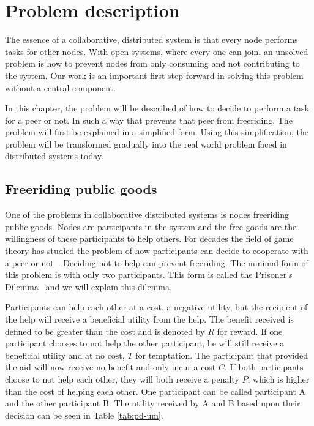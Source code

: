 \chapter{Problem description}
The essence of a collaborative, distributed system is that every node performs tasks for other nodes.
With open systems, where every one can join, an unsolved problem is how to prevent nodes
from only consuming and not contributing to the system.
Our work is an important first step forward in solving this problem without a central component.

In this chapter, the problem will be described of how to decide to perform a task for a peer or not.
In such a way that prevents that peer from freeriding.
The problem will first be explained in a simplified form.
Using this simplification, the problem will be transformed gradually
into the real world problem faced in distributed systems today.

\section{Freeriding public goods}
One of the problems in collaborative distributed systems is nodes freeriding public goods.
Nodes are participants in the system and the free goods are the willingness of these participants to help others.
For decades the field of game theory has studied the problem of how
participants can decide to cooperate with a peer or not~\cite{Hardin-Tragedy}.
Deciding not to help can prevent freeriding.
The minimal form of this problem is with only two participants.
This form is called the Prisoner's Dilemma~\cite{Nowak-PrisonerDilemma,Lai-Incentives}
and we will explain this dilemma.

Participants can help each other at a cost, a negative utility,
but the recipient of the help will receive a beneficial utility from the help.
The benefit received is defined to be greater
than the cost and is denoted by $R$ for reward.
If one participant chooses to not help the other participant,
he will still receive a beneficial utility and at no cost, $T$ for temptation.
The participant that provided the aid will now receive no benefit and only incur a cost $C$.
If both participants choose to not help each other,
they will both receive a penalty $P$, which is higher than the cost of helping each other.
One participant can be called participant A and the other participant B.
The utility received by A and B based upon their decision can be seen in Table \ref{tab:pd-um}.

